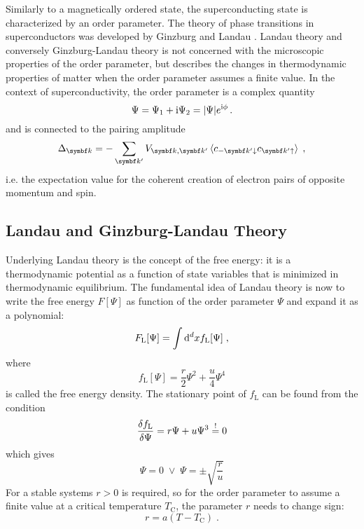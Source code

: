 \documentclass[../main.tex]{subfiles}
\begin{document}
Similarly to a magnetically ordered state, the superconducting state is characterized by an order parameter.
The theory of phase transitions in superconductors was developed by Ginzburg and Landau \cite{ginzburgTheorySuperconductivity1950}.
Landau theory and conversely Ginzburg-Landau theory is not concerned with the microscopic properties of the order parameter, but describes the changes in thermodynamic properties of matter when the order parameter assumes a finite value.
In the context of superconductivity, the order parameter is a complex quantity
\begin{equation}
	\Psi = \Psi_1 + \mathrm{i} \Psi_2 = \vert \Psi \vert e^{\mathrm{i} \phi} \,.
\end{equation}
and is connected to the pairing amplitude 
\begin{equation}
	\Delta_{\vb{k}} = -\sum_{\vb{k}^{\prime}} V_{\vb{k}, \vb{k}^{\prime}} \braket{ c_{-\vb{k}^{\prime} \downarrow} c_{\vb{k}^{\prime} \uparrow}} \;,
\end{equation}
i.e. the expectation value for the coherent creation of electron pairs of opposite momentum and spin.

\subsection*{Landau and Ginzburg-Landau Theory}\label{sub:Landau and Ginzburg-Landau Theory}

Underlying Landau theory is the concept of the free energy: it is a thermodynamic potential as a function of state variables that is minimized in thermodynamic equilibrium.
The fundamental idea of Landau theory is now to write the free energy \(F[\Psi]\) as function of the order parameter \(\Psi\) and expand it as a polynomial:
\begin{equation}
	F_{\mathrm{L}}[\Psi] = \int \odif[order={d}]{x} f_{\mathrm{L}} [\Psi] \;,
\end{equation}
where
\begin{equation}
	f_{\mathrm{L}} [\Psi] = \frac{r}{2} \Psi^2 + \frac{u}{4} \Psi^4
\end{equation}
is called the free energy density.
The stationary point of \(f_{\mathrm{L}}\) can be found from the condition
\begin{equation}
	\fdv{f_{\mathrm{L}}}{\Psi} =  r \Psi + u \Psi^3 \overset{!}{=} 0
\end{equation}
which gives
\begin{equation}
	\Psi = 0 \; \lor \; \Psi = \pm \sqrt{\frac{r}{u}}
\end{equation}
For a stable systems \(r > 0\) is required, so for the order parameter to assume a finite value at a critical temperature \(T_{\mathrm{C}}\), the parameter \(r\) needs to change sign:
\begin{equation}
	r = a(T - T_{\mathrm{C}}) \;.
\end{equation}
\end{document}
